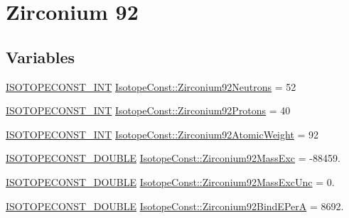 \hypertarget{group___isotope_const-_zirconium-_zr92}{}\section{Zirconium 92}
\label{group___isotope_const-_zirconium-_zr92}
\subsection*{Variables}
\begin{DoxyCompactItemize}
\item 
\mbox{\hyperlink{group___isotope_const-_macros_ga5f18360b3e99483a35c32d789e62621c}{I\+S\+O\+T\+O\+P\+E\+C\+O\+N\+S\+T\+\_\+\+I\+NT}} \mbox{\hyperlink{group___isotope_const-_zirconium-_zr92_gab4bdd106967e2e73c672a59367bf703f}{Isotope\+Const\+::\+Zirconium92\+Neutrons}} = 52
\item 
\mbox{\hyperlink{group___isotope_const-_macros_ga5f18360b3e99483a35c32d789e62621c}{I\+S\+O\+T\+O\+P\+E\+C\+O\+N\+S\+T\+\_\+\+I\+NT}} \mbox{\hyperlink{group___isotope_const-_zirconium-_zr92_ga2a71ec97e69a6f6b41298e53ef76d228}{Isotope\+Const\+::\+Zirconium92\+Protons}} = 40
\item 
\mbox{\hyperlink{group___isotope_const-_macros_ga5f18360b3e99483a35c32d789e62621c}{I\+S\+O\+T\+O\+P\+E\+C\+O\+N\+S\+T\+\_\+\+I\+NT}} \mbox{\hyperlink{group___isotope_const-_zirconium-_zr92_ga071c0f33dab602b2d8fbc5a9b842d9d8}{Isotope\+Const\+::\+Zirconium92\+Atomic\+Weight}} = 92
\item 
\mbox{\hyperlink{group___isotope_const-_macros_ga8f45a7272ce02c0b4c65c44636ed719a}{I\+S\+O\+T\+O\+P\+E\+C\+O\+N\+S\+T\+\_\+\+D\+O\+U\+B\+LE}} \mbox{\hyperlink{group___isotope_const-_zirconium-_zr92_ga1e78d18c65d2547733a465be44f79ccd}{Isotope\+Const\+::\+Zirconium92\+Mass\+Exc}} = -\/88459.
\item 
\mbox{\hyperlink{group___isotope_const-_macros_ga8f45a7272ce02c0b4c65c44636ed719a}{I\+S\+O\+T\+O\+P\+E\+C\+O\+N\+S\+T\+\_\+\+D\+O\+U\+B\+LE}} \mbox{\hyperlink{group___isotope_const-_zirconium-_zr92_gaa5cf93a24a3d9b09da5bbefe5c224b5a}{Isotope\+Const\+::\+Zirconium92\+Mass\+Exc\+Unc}} = 0.
\item 
\mbox{\hyperlink{group___isotope_const-_macros_ga8f45a7272ce02c0b4c65c44636ed719a}{I\+S\+O\+T\+O\+P\+E\+C\+O\+N\+S\+T\+\_\+\+D\+O\+U\+B\+LE}} \mbox{\hyperlink{group___isotope_const-_zirconium-_zr92_gabf10cbb9b9a0ac76aa3d351caaadbdf4}{Isotope\+Const\+::\+Zirconium92\+Bind\+E\+PerA}} = 8692.
\item 

\end{DoxyCompactItemize}
